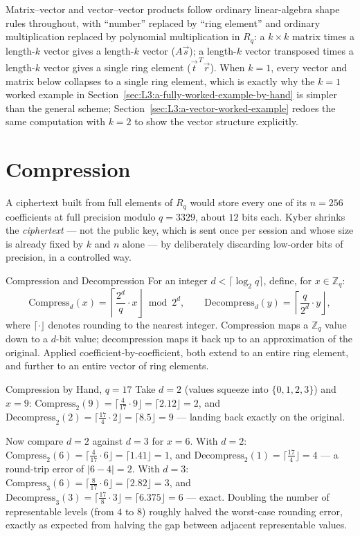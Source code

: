 Matrix--vector and vector--vector products follow ordinary linear-algebra shape rules throughout, with ``number'' replaced by ``ring element'' and ordinary multiplication replaced by polynomial multiplication in $R_q$: a $k\times k$ matrix times a length-$k$ vector gives a length-$k$ vector ($A\vec s$); a length-$k$ vector transposed times a length-$k$ vector gives a single ring element ($\vec t^{\,T}\vec r$). When $k=1$, every vector and matrix below collapses to a single ring element, which is exactly why the $k=1$ worked example in Section~\ref{sec:L3:a-fully-worked-example-by-hand} is simpler than the general scheme; Section~\ref{sec:L3:a-vector-worked-example} redoes the same computation with $k=2$ to show the vector structure explicitly.

\section{Compression}
\label{sec:L3:compression-trading-precision-for-size}

A ciphertext built from full elements of $R_q$ would store every one of its $n=256$ coefficients at full precision modulo $q=3329$, about $12$ bits each. Kyber shrinks the \emph{ciphertext} --- not the public key, which is sent once per session and whose size is already fixed by $k$ and $n$ alone --- by deliberately discarding low-order bits of precision, in a controlled way.

\begin{defbox}{Compression and Decompression}
For an integer $d < \lceil \log_2 q \rceil$, define, for $x \in \mathbb{Z}_q$:
$$
\mathrm{Compress}_d(x) = \left\lceil \frac{2^d}{q}\cdot x \right\rfloor \bmod 2^d, \qquad
\mathrm{Decompress}_d(y) = \left\lceil \frac{q}{2^d}\cdot y \right\rfloor,
$$
where $\lceil \cdot \rfloor$ denotes rounding to the nearest integer. Compression maps a $\mathbb{Z}_q$ value down to a $d$-bit value; decompression maps it back up to an approximation of the original. Applied coefficient-by-coefficient, both extend to an entire ring element, and further to an entire vector of ring elements.
\end{defbox}

\begin{exbox}{Compression by Hand, $q=17$}
Take $d=2$ (values squeeze into $\{0,1,2,3\}$) and $x=9$: $\mathrm{Compress}_2(9) = \lceil\frac{4}{17}\cdot9\rfloor = \lceil2.12\rfloor = 2$, and $\mathrm{Decompress}_2(2) = \lceil\frac{17}{4}\cdot2\rfloor = \lceil8.5\rfloor = 9$ --- landing back exactly on the original.

Now compare $d=2$ against $d=3$ for $x=6$. With $d=2$: $\mathrm{Compress}_2(6)=\lceil\frac{4}{17}\cdot6\rfloor=\lceil1.41\rfloor=1$, and $\mathrm{Decompress}_2(1)=\lceil\frac{17}{4}\rfloor=4$ --- a round-trip error of $|6-4|=2$. With $d=3$: $\mathrm{Compress}_3(6)=\lceil\frac{8}{17}\cdot6\rfloor=\lceil2.82\rfloor=3$, and $\mathrm{Decompress}_3(3)=\lceil\frac{17}{8}\cdot3\rfloor=\lceil6.375\rfloor=6$ --- exact. Doubling the number of representable levels (from $4$ to $8$) roughly halved the worst-case rounding error, exactly as expected from halving the gap between adjacent representable values.
\end{exbox}

